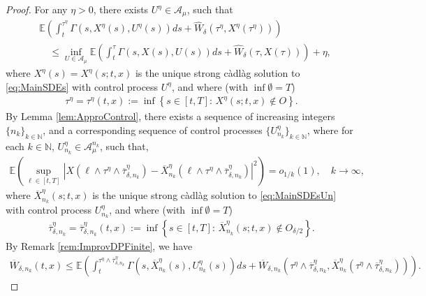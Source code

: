 \documentclass[amscd,amssymb,11pt]{article}
\numberwithin{theorem}{section}
\numberwithin{equation}{section}
\begin{document}
\begin{proof}
For any $\eta>0$, there exists $U^{\eta}\in\mathcal{A}_{\mu}$, such that
\begin{align}
&\mathbb{E}\left(\int_{t}^{\tau^{\eta}}\Gamma\left(s,X^{\eta}(s),U^{\eta}(s)\right)ds+\widehat{W}_{\delta}\left(\tau^{\eta},X^{\eta}(\tau^{\eta})\right)\right)\nonumber\\
\label{eq:Approxeta} &\quad\leq\inf_{U\in\mathcal{A}_{\mu}}\mathbb{E}\left(\int_{t}^{\tau}\Gamma\left(s,X(s),U(s)\right)ds+\widehat{W}_{\delta}\left(\tau,X(\tau)\right)\right)+\eta,
\end{align}
where $X^{\eta}(s)=X^\eta(s;t,x)$ is the unique strong c\`{a}dl\`{a}g solution to \eqref{eq:MainSDEs} with control process $U^{\eta}$, and where (with $\inf\emptyset=T$)
\begin{align*}
\tau^{\eta}=\tau^{\eta}(t,x):=\inf\left\{s\in[t,T]:\,X^{\eta}(s;t,x)\not\in O\right\}.
\end{align*}
By Lemma \ref{lem:ApproControl}, there exists a sequence of increasing integers $\{n_{k}\}_{k\in\mathbb{N}}$, and a corresponding sequence of control processes $\{U^{\eta}_{n_{k}}\}_{k\in\mathbb{N}}$, where for each $k\in\mathbb{N}$, $U^{\eta}_{n_{k}}\in\mathcal{A}_{\mu}^{n_{k}}$, such that,
\begin{align*}
\mathbb{E}\left(\sup_{\ell\in[t,T]}\left|X\left(\ell\wedge\tau^{\eta}\wedge\overline{\tau}^{\eta}_{\delta,n_{k}}\right)-\overline{X}^{\eta}_{n_{k}}\left(\ell\wedge\tau^{\eta}\wedge\overline{\tau}^{\eta}_{\delta,n_{k}}\right)\right|^{2}\right)=o_{1/k}(1),\quad k\rightarrow\infty,
\end{align*}
where $\overline{X}^{\eta}_{n_{k}}(s;t,x)$ is the unique strong c\`{a}dl\`{a}g solution to \eqref{eq:MainSDEsUn} with control process $U^{\eta}_{n_{k}}$, and where (with $\inf\emptyset=T$)
\begin{align*}
\overline{\tau}^{\eta}_{\delta,n_{k}}=\overline{\tau}^{\eta}_{\delta,n_{k}}(t,x):=\inf\left\{s\in[t,T]:\,\overline{X}_{n_{k}}^{\eta}(s;t,x)\not\in O_{\delta/2}\right\}.
\end{align*}
By Remark \ref{rem:ImprovDPFinite}, we have
\begin{align}\label{eq:OverlineWdeltankleq}
\overline{W}_{\delta,n_{k}}(t,x)\leq\mathbb{E}\left(\int_{t}^{\tau^{\eta}\wedge\overline{\tau}_{\delta,n_{k}}^{\eta}}\Gamma\!\left(s,\overline{X}_{n_{k}}^{\eta}(s),U_{n_{k}}^{\eta}(s)\right)ds+\overline{W}_{\delta,n_{k}}\!\left(\tau^{\eta}\!\wedge\!\overline{\tau}_{\delta,n_{k}}^{\eta},\overline{X}_{n_{k}}^{\eta}\!\left(\tau^{\eta}\!\wedge\!\overline{\tau}_{\delta,n_{k}}^{\eta}\right)\right)\!\right).
\end{align}


\end{proof}
\end{document}
